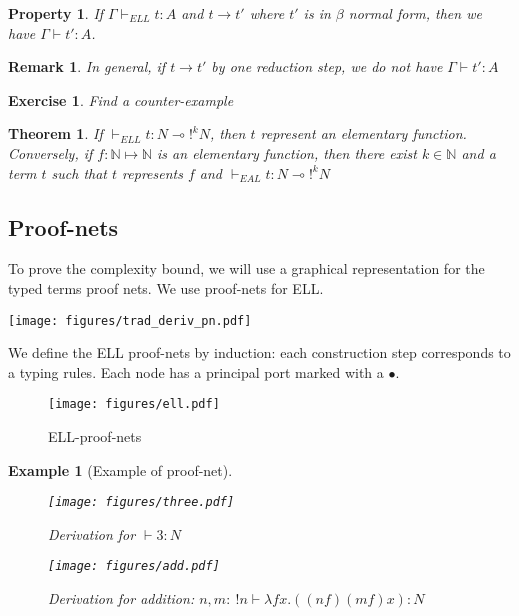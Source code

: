 \documentclass[a4paper,10pt]{article}
\newcommand{\limpl}{\multimap}  %
\newcommand{\Nset}{\mathbb{N}} %
\newtheorem{prop}{Property}
\newtheorem{thm}{Theorem}
\newtheorem{ex}{Example}
\newtheorem{exo}{Exercise}
\newtheorem{rmk}{Remark}
\begin{document}
\begin{prop}
If $\Gamma \vdash_{ELL} t:A$ and $t \rightarrow t'$ where $t'$ is in $\beta$ normal form, then we have $\Gamma \vdash t':A$.
\end{prop}

\begin{rmk}
In general, if $t \rightarrow t'$ by one reduction step, we do not have $\Gamma \vdash t':A$
\end{rmk}

\begin{exo}
Find a counter-example
\end{exo}

\begin{thm}
If $\vdash_{ELL} t:N \limpl !^{k} N$, then $t$ represent an elementary function.\\
Conversely, if $f: \Nset \mapsto \Nset$ is an elementary function, then there exist $k\in \Nset$ and a term $t$ such that $t$ represents $f$ and $\vdash_{EAL} t:N\limpl !^{k}N$
\end{thm}


\subsection{Proof-nets}

 To prove the complexity bound, we will use a graphical representation for the typed terms proof nets. We use proof-nets for ELL.
\begin{center}
	\vspace{-0.3cm}
	\texttt{[image: figures/trad\_deriv\_pn.pdf]}
\end{center}

 We define the ELL proof-nets by induction: each construction step corresponds to a typing rules. Each node has a principal port marked with a $\bullet$.
\begin{figure}[h]
	\begin{center}
		\texttt{[image: figures/ell.pdf]}
		\caption{ELL-proof-nets}
	\end{center}
\end{figure}

\begin{ex}[Example of proof-net]

\begin{figure}[h]
   \begin{minipage}[c]{.46\linewidth}
      \texttt{[image: figures/three.pdf]}
      \caption{Derivation for $\vdash 3:N$}
   \end{minipage} \hfill
   \begin{minipage}[c]{.46\linewidth}
      \texttt{[image: figures/add.pdf]}
      \caption{Derivation for addition: $n,m:\ !n \vdash \lambda f x. ((n f) (m f) x): N$}
   \end{minipage}
\end{figure}

\end{ex}
\end{document}
